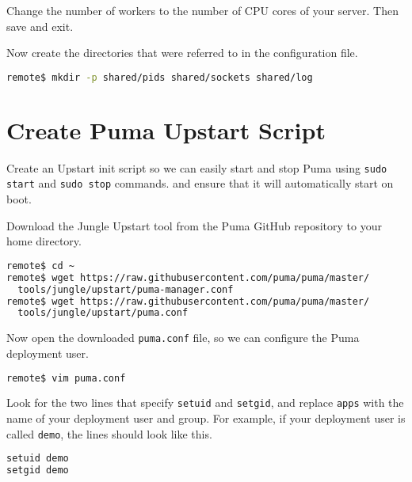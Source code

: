 Change the number of workers to the number of CPU cores of your server.
Then save and exit.

Now create the directories that were referred to in the configuration file.

\begin{minipage}{\linewidth}
\begin{lstlisting}[language=bash]
remote$ mkdir -p shared/pids shared/sockets shared/log
\end{lstlisting}
\end{minipage}

\section{Create Puma Upstart Script}

Create an Upstart init script so we can easily start and stop Puma
using \texttt{sudo start} and \texttt{sudo stop} commands.
and ensure that it will automatically start on boot.

Download the Jungle Upstart tool from the Puma GitHub repository
to your home directory.

\begin{minipage}{\linewidth}
\begin{lstlisting}[language=bash]
remote$ cd ~
remote$ wget https://raw.githubusercontent.com/puma/puma/master/
  tools/jungle/upstart/puma-manager.conf
remote$ wget https://raw.githubusercontent.com/puma/puma/master/
  tools/jungle/upstart/puma.conf
\end{lstlisting}
\end{minipage}

Now open the downloaded \texttt{puma.conf} file,
so we can configure the Puma deployment user.

\begin{minipage}{\linewidth}
\begin{lstlisting}[language=bash]
remote$ vim puma.conf
\end{lstlisting}
\end{minipage}

Look for the two lines that specify \texttt{setuid} and \texttt{setgid},
and replace \texttt{apps}
with the name of your deployment user and group. For example,
if your deployment user is called \texttt{demo}, the lines should look like this.

\begin{minipage}{\linewidth}
  \begin{lstlisting}[language=bash, caption={puma.conf}]
setuid demo
setgid demo
\end{lstlisting}
\end{minipage}

